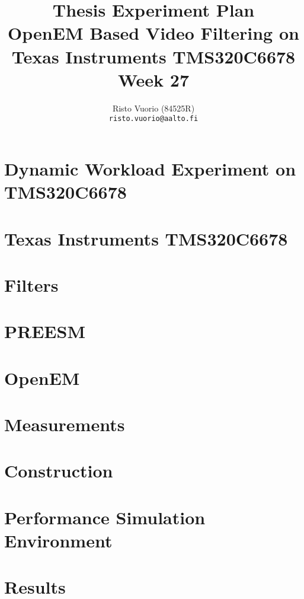 \documentclass[a4paper,10pt]{article}
\title{Thesis Experiment Plan \\
		OpenEM Based Video Filtering on Texas Instruments TMS320C6678 \\
		Week 27}
\author{Risto Vuorio (84525R) \\
		{\tt risto.vuorio@aalto.fi}}
\begin{document}
\maketitle
\newpage
\tableofcontents
\newpage

\section{Dynamic Workload Experiment on TMS320C6678}


\section{Texas Instruments TMS320C6678}


\section{Filters}


\section{PREESM}


\section{OpenEM}


\section{Measurements}


\section{Construction}


\section{Performance Simulation Environment}


\section{Results}


%   

%   
\end{document}
